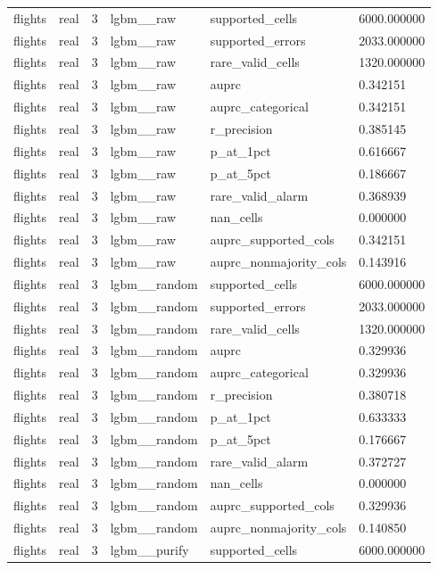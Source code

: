 \begin{tabular}{llllll}
flights & real & 3 & lgbm\_\_raw & supported\_cells & 6000.000000 \\
flights & real & 3 & lgbm\_\_raw & supported\_errors & 2033.000000 \\
flights & real & 3 & lgbm\_\_raw & rare\_valid\_cells & 1320.000000 \\
flights & real & 3 & lgbm\_\_raw & auprc & 0.342151 \\
flights & real & 3 & lgbm\_\_raw & auprc\_categorical & 0.342151 \\
flights & real & 3 & lgbm\_\_raw & r\_precision & 0.385145 \\
flights & real & 3 & lgbm\_\_raw & p\_at\_1pct & 0.616667 \\
flights & real & 3 & lgbm\_\_raw & p\_at\_5pct & 0.186667 \\
flights & real & 3 & lgbm\_\_raw & rare\_valid\_alarm & 0.368939 \\
flights & real & 3 & lgbm\_\_raw & nan\_cells & 0.000000 \\
flights & real & 3 & lgbm\_\_raw & auprc\_supported\_cols & 0.342151 \\
flights & real & 3 & lgbm\_\_raw & auprc\_nonmajority\_cols & 0.143916 \\
flights & real & 3 & lgbm\_\_random & supported\_cells & 6000.000000 \\
flights & real & 3 & lgbm\_\_random & supported\_errors & 2033.000000 \\
flights & real & 3 & lgbm\_\_random & rare\_valid\_cells & 1320.000000 \\
flights & real & 3 & lgbm\_\_random & auprc & 0.329936 \\
flights & real & 3 & lgbm\_\_random & auprc\_categorical & 0.329936 \\
flights & real & 3 & lgbm\_\_random & r\_precision & 0.380718 \\
flights & real & 3 & lgbm\_\_random & p\_at\_1pct & 0.633333 \\
flights & real & 3 & lgbm\_\_random & p\_at\_5pct & 0.176667 \\
flights & real & 3 & lgbm\_\_random & rare\_valid\_alarm & 0.372727 \\
flights & real & 3 & lgbm\_\_random & nan\_cells & 0.000000 \\
flights & real & 3 & lgbm\_\_random & auprc\_supported\_cols & 0.329936 \\
flights & real & 3 & lgbm\_\_random & auprc\_nonmajority\_cols & 0.140850 \\
flights & real & 3 & lgbm\_\_purify & supported\_cells & 6000.000000 \\

\end{tabular}
